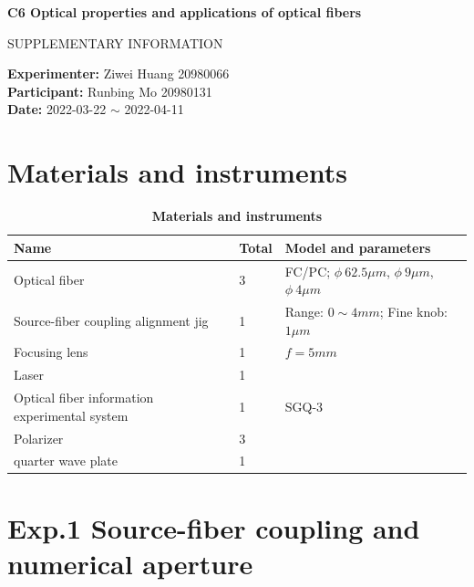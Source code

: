 \documentclass[12pt,a4paper,UTF8]{article}
\begin{document}

\begin{center}
\LARGE\textbf{C6 Optical properties and applications of optical fibers}

\vspace{0.5em}
\large{SUPPLEMENTARY INFORMATION}
\end{center}

\noindent
\textbf{Experimenter:} Ziwei Huang 20980066 \\
\textbf{Participant:} Runbing Mo 20980131 \\
\textbf{Date:} 2022-03-22 $\sim$ 2022-04-11


\tableofcontents
\newpage

\section{Materials and instruments}
\begin{table}[htbp]
    \centering
        \begin{tabular}{llll}
            \toprule
            Name &Total &Model and parameters \\
            \midrule
            Optical fiber	&3	&FC/PC; $\phi \ 62.5\mu m$, $\phi \ 9\mu m$, $\phi \ 4\mu m$    \\    
            Source-fiber coupling alignment jig	&1	& Range: $0 \sim 4 mm$; Fine knob: $1 \mu m$ \\    
            Focusing lens	&1	& $f = 5mm$    \\    
            Laser	        &1	&    \\    
            Optical fiber information experimental system	&1	& SGQ-3    \\    
            Polarizer	    &3	&    \\   
            quarter wave plate  &1	&    \\   
            \bottomrule
        \end{tabular}
        \caption{\textbf{Materials and instruments}}
\end{table}	

\section{Exp.1 Source-fiber coupling and numerical aperture}
\end{document}
